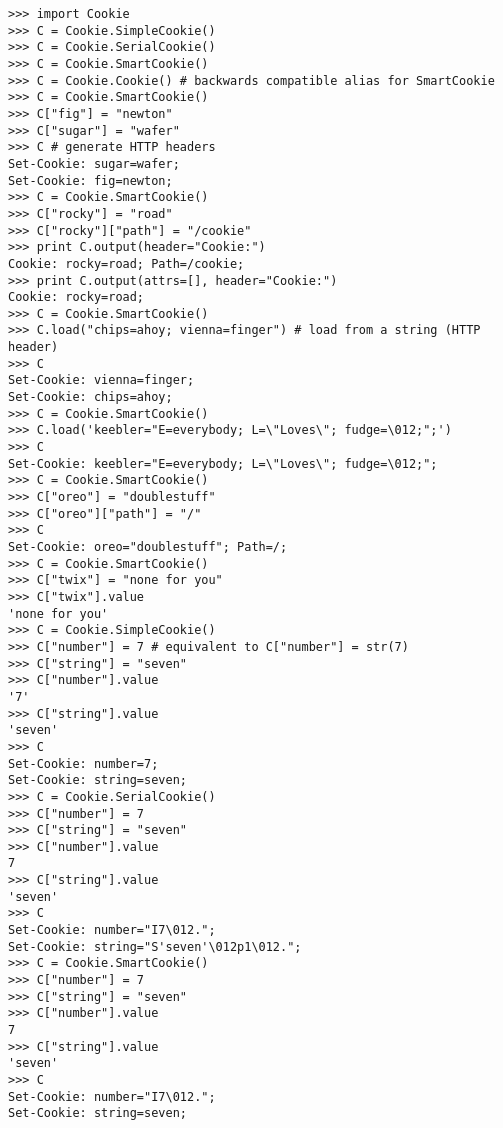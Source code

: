 \begin{verbatim}
>>> import Cookie
>>> C = Cookie.SimpleCookie()
>>> C = Cookie.SerialCookie()
>>> C = Cookie.SmartCookie()
>>> C = Cookie.Cookie() # backwards compatible alias for SmartCookie
>>> C = Cookie.SmartCookie()
>>> C["fig"] = "newton"
>>> C["sugar"] = "wafer"
>>> C # generate HTTP headers
Set-Cookie: sugar=wafer;
Set-Cookie: fig=newton;
>>> C = Cookie.SmartCookie()
>>> C["rocky"] = "road"
>>> C["rocky"]["path"] = "/cookie"
>>> print C.output(header="Cookie:")
Cookie: rocky=road; Path=/cookie;
>>> print C.output(attrs=[], header="Cookie:")
Cookie: rocky=road;
>>> C = Cookie.SmartCookie()
>>> C.load("chips=ahoy; vienna=finger") # load from a string (HTTP header)
>>> C
Set-Cookie: vienna=finger;
Set-Cookie: chips=ahoy;
>>> C = Cookie.SmartCookie()
>>> C.load('keebler="E=everybody; L=\"Loves\"; fudge=\012;";')
>>> C
Set-Cookie: keebler="E=everybody; L=\"Loves\"; fudge=\012;";
>>> C = Cookie.SmartCookie()
>>> C["oreo"] = "doublestuff"
>>> C["oreo"]["path"] = "/"
>>> C
Set-Cookie: oreo="doublestuff"; Path=/;
>>> C = Cookie.SmartCookie()
>>> C["twix"] = "none for you"
>>> C["twix"].value
'none for you'
>>> C = Cookie.SimpleCookie()
>>> C["number"] = 7 # equivalent to C["number"] = str(7)
>>> C["string"] = "seven"
>>> C["number"].value
'7'
>>> C["string"].value
'seven'
>>> C
Set-Cookie: number=7;
Set-Cookie: string=seven;
>>> C = Cookie.SerialCookie()
>>> C["number"] = 7
>>> C["string"] = "seven"
>>> C["number"].value
7
>>> C["string"].value
'seven'
>>> C
Set-Cookie: number="I7\012.";
Set-Cookie: string="S'seven'\012p1\012.";
>>> C = Cookie.SmartCookie()
>>> C["number"] = 7
>>> C["string"] = "seven"
>>> C["number"].value
7
>>> C["string"].value
'seven'
>>> C
Set-Cookie: number="I7\012.";
Set-Cookie: string=seven;
\end{verbatim}
